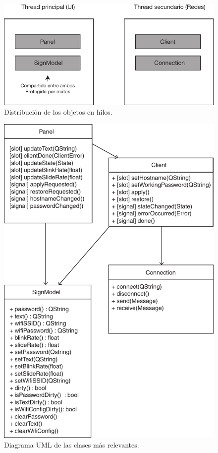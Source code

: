 \begin{figure}[!ht]
	\centering
	\includegraphics[scale=0.8]{imagenes/qt-threads.pdf}
	\caption{Distribución de los objetos en hilos.}
	\label{fig:qt-threads}
\end{figure}

\begin{figure}[!ht]
	\centering
	\includegraphics[scale=0.8]{imagenes/uml-cliente.pdf}
	\caption{Diagrama UML de las clases más relevantes.}
	\label{fig:uml-cliente}
\end{figure}

